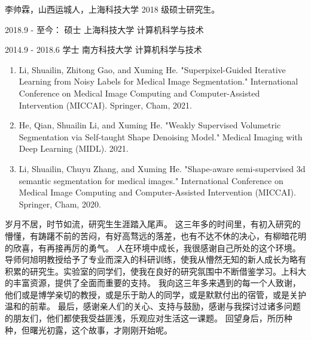 \ifgraduate
\begin{resume}
李帅霖，山西运城人，上海科技大学 2018 级硕士研究生。
\end{resume}

\begin{education}
2018.9 - 至今：      \quad 硕士 \quad 上海科技大学 \quad 计算机科学与技术

2014.9 - 2018.6     \quad 学士 \quad 南方科技大学 \quad 计算机科学与技术
\end{education}

\begin{publications}
\begin{enumerate}
    \item Li, Shuailin, Zhitong Gao, and Xuming He. "Superpixel-Guided Iterative Learning from Noisy Labels for Medical Image Segmentation." International Conference on Medical Image Computing and Computer-Assisted Intervention (MICCAI). Springer, Cham, 2021.
    \item He, Qian, Shuailin Li, and Xuming He. "Weakly Supervised Volumetric Segmentation via Self-taught Shape Denoising Model." Medical Imaging with Deep Learning (MIDL). 2021.
    \item Li, Shuailin, Chuyu Zhang, and Xuming He. "Shape-aware semi-supervised 3d semantic segmentation for medical images." International Conference on Medical Image Computing and Computer-Assisted Intervention (MICCAI). Springer, Cham, 2020.
\end{enumerate}

\end{publications}

\begin{publications*}
\end{publications*}



\fi


\begin{acknowledgement}
岁月不居，时节如流，研究生生涯踏入尾声。
这三年多的时间里，有初入研究的懵懂，有踌躇不前的苦闷，有好高骛远的落差，也有不达不休的决心，有柳暗花明的欣喜，有再接再厉的勇气。
人在环境中成长，我很感谢自己所处的这个环境。导师何旭明教授给予了专业而深入的科研训练，使我从懵然无知的新人成长为略有积累的研究生。实验室的同学们，使我在良好的研究氛围中不断借鉴学习。上科大的丰富资源，提供了全面而重要的支持。
我向这三年多来遇到的每一个人致谢，他们或是博学亲切的教授，或是乐于助人的同学，或是默默付出的宿管，或是关护温和的前辈。
最后，感谢亲人们的关心、支持与鼓励，感谢与我探讨过诸多问题的朋友们，他们都使我受益匪浅，乐观应对生活这一课题。
回望身后，所历种种，但曙光初露，这个故事，才刚刚开始呢。

\end{acknowledgement}